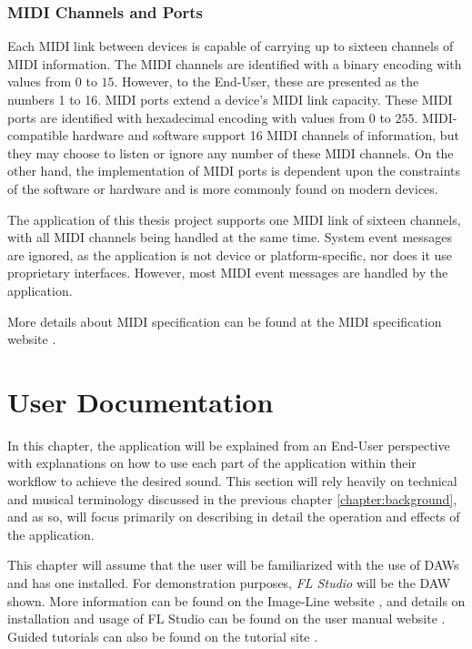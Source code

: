 \documentclass[a4paper,12pt]{report}
\begin{document}
\subsection{MIDI Channels and Ports}
\label{subsec:midichannelports}
Each MIDI link between devices is capable of carrying up to sixteen channels of MIDI information. The MIDI channels are identified with a binary encoding with values from $0$ to $15$. However, to the End-User, these are presented as the numbers 1 to 16. MIDI ports extend a device's MIDI link capacity. These MIDI ports are identified with hexadecimal encoding with values from $0$ to $255$. MIDI-compatible hardware and software support 16 MIDI channels of information, but they may choose to listen or ignore any number of these MIDI channels. On the other hand, the implementation of MIDI ports is dependent upon the constraints of the software or hardware and is more commonly found on modern devices.

The application of this thesis project supports one MIDI link of sixteen channels, with all MIDI channels being handled at the same time. System event messages are ignored, as the application is not device or platform-specific, nor does it use proprietary interfaces. However, most MIDI event messages are handled by the application.

More details about MIDI specification can be found at the MIDI specification website \cite{midispec}.


\chapter{User Documentation}
\label{chapter:userdoc}
In this chapter, the application will be explained from an End-User perspective with explanations on how to use each part of the application within their workflow to achieve the desired sound. This section will rely heavily on technical and musical terminology discussed in the previous chapter \ref{chapter:background}, and as so, will focus primarily on describing in detail the operation and effects of the application.

This chapter will assume that the user will be familiarized with the use of DAWs and has one installed. For demonstration purposes, \emph{FL Studio} will be the DAW shown. More information can be found on the Image-Line website \cite{floverview}, and details on installation and usage of FL Studio can be found on the user manual website \cite{flmanual}. Guided tutorials can also be found on the tutorial site \cite{fltutorials}.
\end{document}
